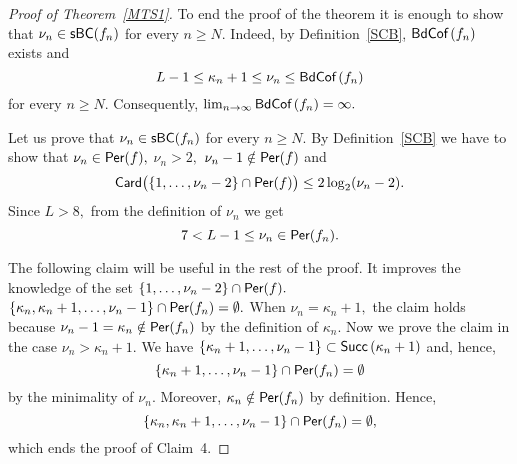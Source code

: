 \documentclass[a4paper, 11pt]{amsart}
\numberwithin{equation}{section}
\theoremstyle{customnumberedtheorem}
\theoremstyle{definitionwithbfnote}
\newenvironment{autocase}[2][Case]{\case{#1 #2.}}{\endcase}
\DeclareMathOperator{\bc}{\textsf{\upshape BdCof\,}}
\DeclareMathOperator{\Per}{\textsf{\upshape Per}}
\DeclareMathOperator{\Card}{\textsf{\upshape Card}}
\DeclareMathOperator{\Succ}{\textsf{\upshape Succ}}
\DeclareMathOperator{\sbcset}{\textsf{\upshape sBC}}
\newcommand{\succs}[1]{\ensuremath{\Succ\left(#1\right)}}
\begin{document}
\begin{proof}[Proof of Theorem~\ref{MTS1}]
To end the proof of the theorem it is enough to show that
$\nu_n \in \sbcset(f_n)$ for every $n \ge N.$
Indeed, by Definition~\ref{SCB}, $\bc(f_n)$ exists and
\begin{equation}\label{oftenusefulbound}
 L-1 \le \kappa_n + 1 \le \nu_n \le \bc(f_n)
\end{equation}
for every $n \ge N.$
Consequently, $\lim_{n\to\infty} \bc(f_n) = \infty.$

Let us prove that $\nu_n \in \sbcset(f_n)$ for every $n \ge N.$
By Definition~\ref{SCB} we have to show that $\nu_n \in \Per(f),$
$\nu_n > 2,$ $\nu_n-1 \notin \Per (f)$ and
\begin{equation}\label{TheDensity}
\Card\bigl(\{1,\ldots, \nu_n-2\}\cap \Per(f)\bigr) \le 2 \log_2(\nu_n-2).
\end{equation}
Since $L > 8,$ from the definition of $\nu_n$ we get
\[
 7 < L-1 \le \nu_n \in \Per(f_n).
\]

The following claim will be useful in the rest of the proof.
It improves the knowledge of the set
$\{1,\ldots, \nu_n-2\}\cap \Per(f).$
\begin{autocase}[Claim]{4}
$\{\kappa_n, \kappa_n + 1,\dots, \nu_n-1\} \cap \Per(f_n) = \emptyset.$
\end{autocase}
When $\nu_n = \kappa_n + 1,$ the claim holds because
$\nu_n - 1 = \kappa_n \notin \Per(f_n)$
by the definition of $\kappa_n.$
Now we prove the claim in the case $\nu_n > \kappa_n + 1.$
We have
$\{\kappa_n + 1,\dots, \nu_n-1\} \subset \succs{\kappa_n + 1}$
and, hence,
\[ \{\kappa_n + 1,\dots, \nu_n-1\} \cap \Per(f_n) = \emptyset \]
by the minimality of $\nu_n.$
Moreover, $\kappa_n \notin \Per(f_n)$ by definition.
Hence,
\[
   \{\kappa_n, \kappa_n + 1,\dots, \nu_n-1\} \cap \Per(f_n) = \emptyset,
\]
which ends the proof of Claim~4.


\end{proof}
\end{document}

